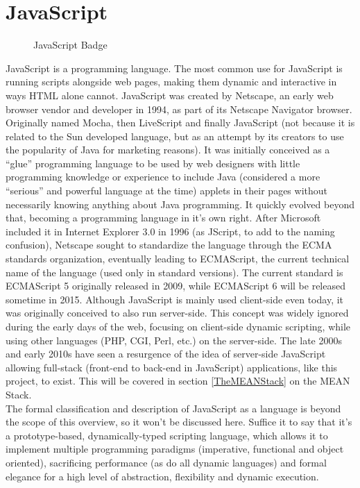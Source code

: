 \section{JavaScript} \label{JavaScript}
\begin{figure}[h]
\centering

\caption{JavaScript Badge}
\end{figure}
JavaScript is a programming language. The most common use for JavaScript is running scripts alongside web pages, making
them dynamic and interactive in ways HTML alone cannot. JavaScript was created by Netscape, an early web browser vendor
and developer in 1994, as part of its Netscape Navigator browser. Originally named Mocha, then LiveScript and finally
JavaScript (not because it is related to the Sun developed language, but as an attempt by its creators to use the
popularity of Java for marketing reasons). It was initially conceived as a ``glue'' programming language to be used by
web designers with little programming knowledge or experience to include Java (considered a more ``serious'' and powerful
language at the time) applets in their pages without necessarily knowing anything about Java programming. It quickly
evolved beyond that, becoming a programming language in it's own right. After Microsoft included it in Internet Explorer
3.0 in 1996 (as JScript, to add to the naming confusion), Netscape sought to standardize the language through the ECMA
standards organization, eventually leading to ECMAScript, the current technical name of the language (used only in
standard versions). The current standard is ECMAScript 5 originally released in 2009, while ECMAScript 6 will be released
sometime in 2015. Although JavaScript is mainly used client-side even today, it was originally conceived to also run
server-side. This concept was widely ignored during the early days of the web, focusing on client-side dynamic scripting,
while using other languages (PHP, CGI, Perl, etc.) on the server-side. The late 2000s and early 2010s have seen a
resurgence of the idea of server-side JavaScript allowing full-stack (front-end to back-end in JavaScript) applications,
like this project, to exist. This will be covered in section \ref{TheMEANStack} on the MEAN Stack.\\

The formal classification and description of JavaScript as a language is beyond the scope of this overview, so it won't
be discussed here. Suffice it to say that it's a prototype-based, dynamically-typed scripting language, which allows it
to implement multiple programming paradigms (imperative, functional and object oriented), sacrificing performance (as do
all dynamic languages) and formal elegance for a high level of abstraction, flexibility and dynamic execution.\\


